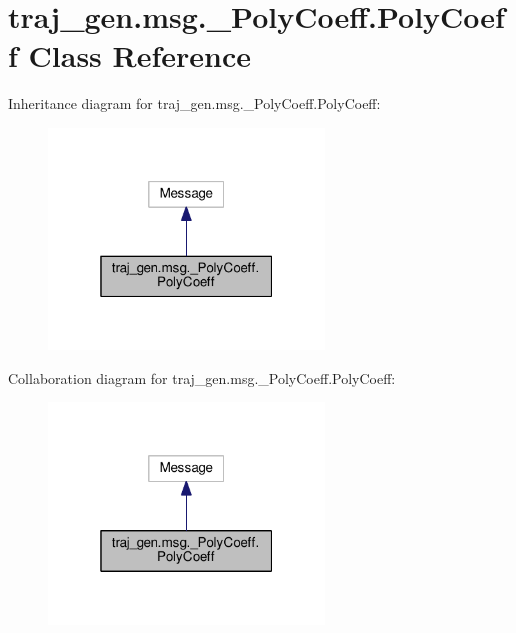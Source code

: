 \hypertarget{classtraj__gen_1_1msg_1_1___poly_coeff_1_1_poly_coeff}{}\section{traj\+\_\+gen.\+msg.\+\_\+\+Poly\+Coeff.\+Poly\+Coeff Class Reference}
\label{classtraj__gen_1_1msg_1_1___poly_coeff_1_1_poly_coeff}


Inheritance diagram for traj\+\_\+gen.\+msg.\+\_\+\+Poly\+Coeff.\+Poly\+Coeff\+:
\nopagebreak
\begin{figure}[H]
\begin{center}
\leavevmode
\includegraphics[width=208pt]{classtraj__gen_1_1msg_1_1___poly_coeff_1_1_poly_coeff__inherit__graph}
\end{center}
\end{figure}


Collaboration diagram for traj\+\_\+gen.\+msg.\+\_\+\+Poly\+Coeff.\+Poly\+Coeff\+:
\nopagebreak
\begin{figure}[H]
\begin{center}
\leavevmode
\includegraphics[width=208pt]{classtraj__gen_1_1msg_1_1___poly_coeff_1_1_poly_coeff__coll__graph}
\end{center}
\end{figure}
